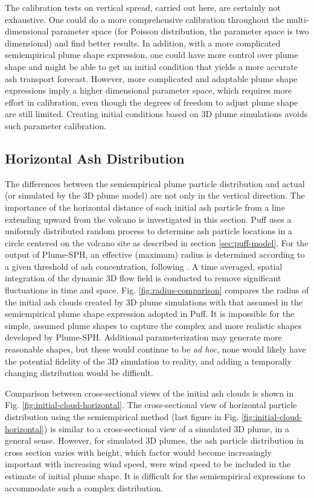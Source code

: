 \documentclass[utf8]{frontiersSCNS} %
\begin{document}
The calibration tests on vertical spread, carried out here, are certainly not exhaustive. One could do a more comprehensive calibration throughout the multi-dimensional parameter space (for Poisson distribution, the parameter space is two dimensional) and find better results. In addition, with a more complicated semiempirical plume shape expression, one could have more control over plume shape and might be able to get an initial condition that yields a more accurate ash transport forecast. However, more complicated and adaptable plume shape expressions imply a higher dimensional parameter space, which requires more effort in calibration, even though the degrees of freedom to adjust plume shape are still limited.  Creating initial conditions based on 3D plume simulations avoids such parameter calibration.

\subsection{Horizontal Ash Distribution}

The differences between the semiempirical plume particle distribution and actual (or simulated by the 3D plume model) are not only in the vertical direction. The importance of the horizontal distance of each initial ash particle from a line extending upward from the volcano is investigated in this section.  Puff uses a uniformly distributed random process to determine ash particle locations in a circle centered on the volcano site as described in section \ref{sec:puff-model}. For the output of Plume-SPH, an effective (maximum) radius is determined according to a given threshold of ash concentration, following \citet {cerminara2016large}. A time averaged, spatial integration of the dynamic 3D flow field is conducted to remove significant fluctuations in time and space. Fig. \ref{fig:radius-comparison} compares the radius of the initial ash clouds created by 3D plume simulations with that assumed in the semiempirical plume shape expression adopted in Puff. It is impossible for the simple, assumed plume shapes to capture the complex and more realistic shapes developed by Plume-SPH. Additional parameterization may generate more reasonable shapes, but these would continue to be \textit{ad hoc}, none would likely have the potential fidelity of the 3D simulation to reality, and adding a temporally changing distribution would be difficult.

Comparison between cross-sectional views of the initial ash clouds is shown in Fig. \ref{fig:initial-cloud-horizontal}. The cross-sectional view of horizontal particle distribution using the semiempirical method (last figure in Fig. \ref{fig:initial-cloud-horizontal}) is similar to a cross-sectional view of a simulated 3D plume, in a general sense. However, for simulated 3D plumes, the ash particle distribution in cross section varies with height, which factor would become increasingly important with increasing wind speed, were wind speed to be included in the estimate of initial plume shape. It is difficult for the semiempirical expressions to accommodate such a complex distribution.
\end{document}

